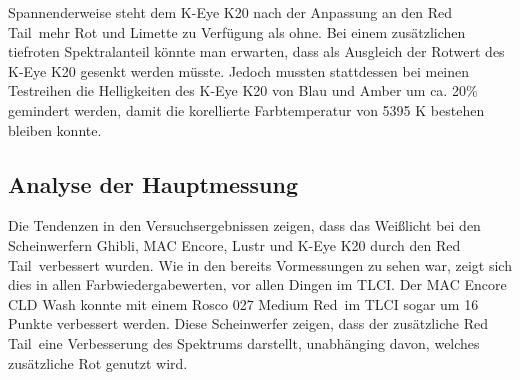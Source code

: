 Spannenderweise steht dem K-Eye K20 nach der Anpassung an den \glqq Red Tail\grqq\ mehr Rot und Limette zu Verfügung als ohne. Bei einem zusätzlichen tiefroten Spektralanteil könnte man erwarten, dass als Ausgleich der Rotwert des K-Eye K20 gesenkt werden müsste. Jedoch mussten stattdessen bei meinen Testreihen die Helligkeiten des K-Eye K20 von Blau und Amber um ca. 20\% gemindert werden, damit die korellierte Farbtemperatur von 5395 K bestehen bleiben konnte.
 

\subsection{Analyse der Hauptmessung}

Die Tendenzen in den Versuchsergebnissen zeigen, dass das Weißlicht bei den Scheinwerfern Ghibli, MAC Encore, Lustr und K-Eye K20 durch den \glqq Red Tail\grqq\ verbessert wurden. Wie in den bereits Vormessungen zu sehen war, zeigt sich dies in allen Farbwiedergabewerten, vor allen Dingen  im TLCI. Der MAC Encore CLD Wash konnte mit einem Rosco 027 \glqq Medium Red\grqq\ im TLCI sogar um 16 Punkte verbessert werden. Diese Scheinwerfer zeigen, dass der zusätzliche \glqq Red Tail\grqq\ eine Verbesserung des Spektrums darstellt, unabhänging davon, welches zusätzliche Rot genutzt wird. 


